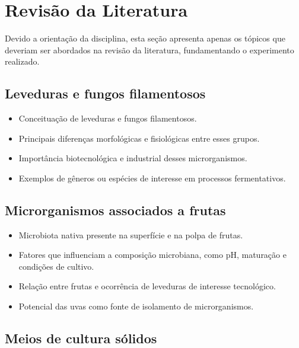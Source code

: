 
\section{Revisão da Literatura}

Devido a orientação da disciplina, esta seção apresenta apenas os tópicos que deveriam ser abordados na revisão da literatura, fundamentando o experimento realizado.

\subsection{Leveduras e fungos filamentosos}

\begin{itemize}
    \item Conceituação de leveduras e fungos filamentosos.
    \item Principais diferenças morfológicas e fisiológicas entre esses grupos.
    \item Importância biotecnológica e industrial desses microrganismos.
    \item Exemplos de gêneros ou espécies de interesse em processos fermentativos.
\end{itemize}

\subsection{Microrganismos associados a frutas}

\begin{itemize}
    \item Microbiota nativa presente na superfície e na polpa de frutas.
    \item Fatores que influenciam a composição microbiana, como pH, maturação e condições de cultivo.
    \item Relação entre frutas e ocorrência de leveduras de interesse tecnológico.
    \item Potencial das uvas como fonte de isolamento de microrganismos.
\end{itemize}

\subsection{Meios de cultura sólidos}

